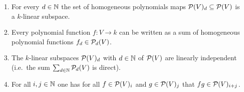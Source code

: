 \begin{lemma}
  \leavevmode
  \begin{enumerate}
    \item
      For every $d \in \mathbb{N}$ the set of homogeneous polynomials maps $\mathcal{P}(V)_d \subseteq \mathcal{P}(V)$ is a $k$-linear subspace.
    \item
      Every polynomial function $f \colon V \to k$ can be written as a sum of homogeneous polynomial functions $f_d \in \mathcal{P}_d(V)$.
    \item
      The $k$-linear subspaces $\mathcal{P}(V)_d$ with $d \in \mathbb{N}$ of $\mathcal{P}(V)$ are linearly independent (i.e.\ the sum $\sum_{d \in \mathbb{N}} \mathcal{P}_d(V)$ is direct).
    \item
      For all $i, j \in \mathbb{N}$ one has for all $f \in \mathcal{P}(V)_i$ and $g \in \mathcal{P}(V)_j$ that $fg \in \mathcal{P}(V)_{i+j}$.
  \end{enumerate}
\end{lemma}


